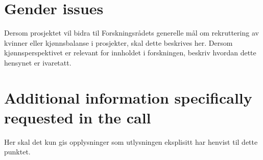 \documentclass[11pt,a4paper,british]{article}
\begin{document}
\section{Gender issues}
Dersom prosjektet vil bidra til Forskningsrådets generelle mål om rekruttering av kvinner eller kjønnsbalanse i prosjekter, skal dette beskrives her.
Dersom kjønnsperspektivet er relevant for innholdet i forskningen, beskriv hvordan dette hensynet er ivaretatt.

\section{Additional information specifically requested in the call}
Her skal det kun gis opplysninger som utlysningen eksplisitt har henvist til dette punktet.

\printbibliography
\end{document}
